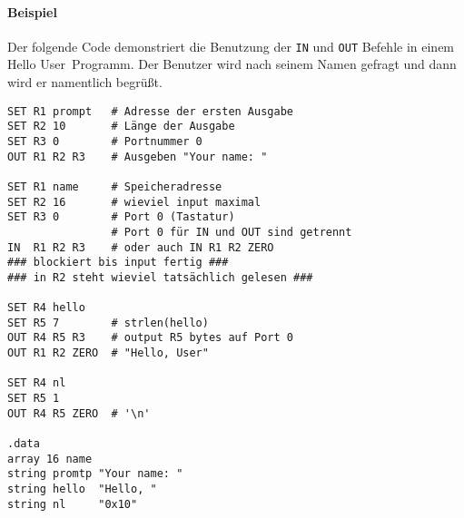 \paragraph{Beispiel}
Der folgende Code demonstriert die Benutzung der \texttt{IN} und \texttt{OUT}
Befehle in einem \glqq Hello User\grqq\ Programm. Der Benutzer wird nach seinem
Namen gefragt und dann wird er namentlich begrüßt.

\begin{lstlisting}
SET R1 prompt   # Adresse der ersten Ausgabe
SET R2 10       # Länge der Ausgabe
SET R3 0        # Portnummer 0
OUT R1 R2 R3    # Ausgeben "Your name: "

SET R1 name     # Speicheradresse
SET R2 16       # wieviel input maximal
SET R3 0        # Port 0 (Tastatur)
                # Port 0 für IN und OUT sind getrennt
IN  R1 R2 R3    # oder auch IN R1 R2 ZERO
### blockiert bis input fertig ###
### in R2 steht wieviel tatsächlich gelesen ###

SET R4 hello
SET R5 7        # strlen(hello)
OUT R4 R5 R3    # output R5 bytes auf Port 0
OUT R1 R2 ZERO  # "Hello, User"

SET R4 nl
SET R5 1
OUT R4 R5 ZERO  # '\n'

.data
array 16 name
string promtp "Your name: "
string hello  "Hello, "
string nl     "0x10"
\end{lstlisting}

